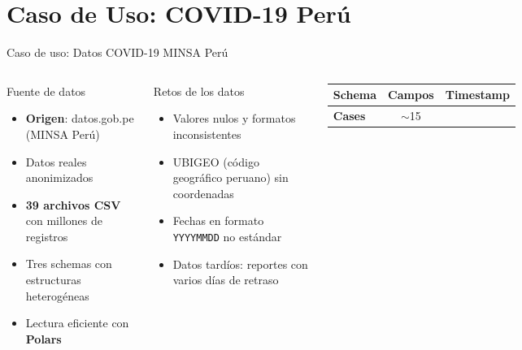 \documentclass[aspectratio=169, 10pt]{beamer}
\begin{document}
\section{Caso de Uso: COVID-19 Per\'u}

\begin{frame}{Caso de uso: Datos COVID-19 MINSA Per\'u}
  \begin{columns}[c]
      \begin{block}{Fuente de datos}
        \begin{itemize}\setlength\itemsep{2pt}
          \item \textbf{Origen}: datos.gob.pe (MINSA Per\'u)
          \item Datos reales anonimizados
          \item \textbf{39 archivos CSV} con millones de registros
          \item Tres schemas con estructuras heterog\'eneas
          \item Lectura eficiente con \textbf{Polars}
        \end{itemize}
      \end{block}
      \vspace{4pt}
      \begin{alertblock}{Retos de los datos}
        \begin{itemize}\setlength\itemsep{2pt}
          \item Valores nulos y formatos inconsistentes
          \item UBIGEO (c\'odigo geogr\'afico peruano) sin coordenadas
          \item Fechas en formato \texttt{YYYYMMDD} no est\'andar
          \item Datos tard\'ios: reportes con varios d\'ias de retraso
        \end{itemize}
      \end{alertblock}
      \renewcommand{\arraystretch}{1.4}
      \begin{tabular}{>{\bfseries\small}l
                      >{\centering\arraybackslash\small}c
                      >{\small}l}
        \toprule
        Schema & Campos & Timestamp \\
        \midrule
        \textcolor{unirdarkblue}{Cases}
          & $\sim$15

\end{tabular}
\end{columns}
\end{frame}
\end{document}
